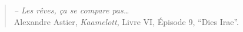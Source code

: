 \begin{dedication}
\begin{small}
\begin{quote}
    \vspace*{4pt}

        \emph{-- Les rêves, ça se compare pas\ldots}\\
        Alexandre Astier, \emph{Kaamelott}, Livre VI, Épisode 9, ``Dies Irae''.
    \end{quote}
    \end{small}















\end{dedication}
